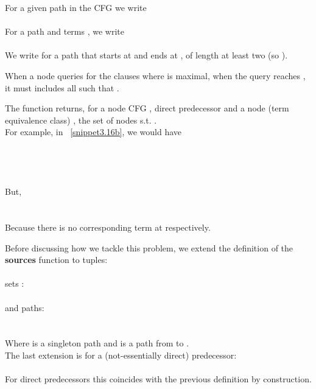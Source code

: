 For a given path  in the CFG we write \\
\\
For a path  and terms , we write\\
\\
We write  for a path that starts at  and ends at , of length at least two (so ).

When a node  queries for the clauses where  is maximal, when the query reaches , it must includes all  such that .

The function  returns, for a node CFG , direct predecessor  and a node (term equivalence class)  , the set of nodes  s.t. .\\
For example, in ~\ref{snippet3.16b}, we would have \\
 \\
 \\
 \\
 \\
But,\\
 \\
 \\
Because there is no corresponding term at  respectively.

Before discussing how we tackle this problem, we extend the definition of the \textbf{sources} function to tuples:\\
 \\
sets :\\
 \\
and paths:\\
\\
\\
Where  is a singleton path and  is a path from  to .\\
The last extension is for a (not-essentially direct) predecessor:\\
\\
For direct predecessors this coincides with the previous definition by construction.

